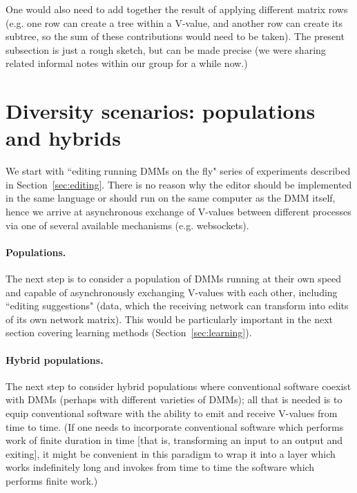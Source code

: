 \documentclass{article}
\begin{document}
One would also need to add together the result of applying different matrix rows (e.g. one row can create a tree
within a V-value, and another row can create its subtree, so the sum of these contributions would need to be taken). The present subsection is just a rough sketch, but
can be made precise (we were sharing related informal notes within our group for a while now.)

\section{Diversity scenarios: populations and hybrids}\label{sec:diversity}

We start with ``editing running DMMs on the fly" series of experiments described in Section~\ref{sec:editing}.
There is no reason why the editor should be implemented in the same language or should run on the same
computer as the DMM itself, hence we arrive at asynchronous exchange of V-values between different processes
via one of several available mechanisms (e.g. websockets). 

\paragraph{Populations.}
The next step is to consider a population of DMMs running at their own speed and capable of asynchronously exchanging
V-values with each other, including ``editing suggestions" (data, which the receiving network can transform into edits of
its own network matrix). This would be particularly important in the next section covering learning methods (Section~\ref{sec:learning}).

\paragraph{Hybrid populations.}
The next step to consider hybrid populations where conventional software coexist with DMMs (perhaps with different varieties of DMMs);
all that is needed is to equip conventional software with the ability to emit and receive V-values from time to time.
(If one needs to incorporate conventional software which performs work of finite duration in time [that is, transforming an input to an output
and exiting], it might
be convenient in this paradigm to wrap it into a layer which works indefinitely long and invokes from time to time the software which performs finite work.)
\end{document}
